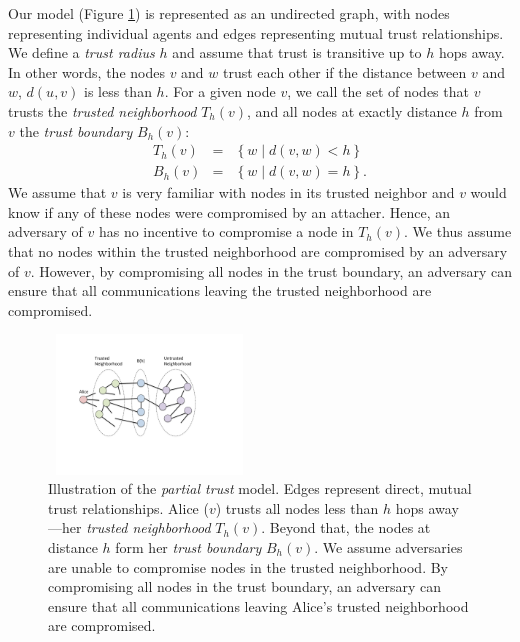\documentclass{sig-alternate-05-2015}
\newcommand{\beq}{\begin{eqnarray}}
\newcommand{\eeq}{\end{eqnarray}}
\begin{document}
Our model (Figure \ref{fig:trust-source})
is represented as an undirected graph,
with nodes representing individual
agents and edges representing mutual trust relationships.
We define a {\em trust radius} $h$ and assume that trust is transitive
up to $h$ hops away.
In other words, the nodes $v$ and $w$ trust each other if the distance between $v$ and $w$, $d(u,v)$ is less than $h$.
For a given node $v$, we call the set of nodes that $v$ trusts the {\em trusted neighborhood} $T_h(v)$,
and all nodes at exactly distance $h$ from $v$ the {\em trust boundary} $B_h(v)$:
\beq
T_h(v) &=& \left\{ w \mid d(v,w) < h \right\} \\
B_h(v) &=& \left\{ w \mid d(v,w) = h \right\}.
\eeq
We assume that $v$ is very familiar with nodes in its trusted neighbor and $v$ would know if any of these nodes were compromised by an attacher. Hence, an adversary of $v$ has no incentive to compromise a node in  $T_h(v)$. We thus assume that no nodes within the trusted neighborhood are compromised
by an adversary of $v$. However, by compromising all nodes in the trust boundary, an adversary can
ensure that all communications leaving the trusted neighborhood are compromised. 

\begin{figure}
\centerline{\includegraphics[width=2.12in,height=1.46in]{fig-alice_trusted_neigh2}}
\caption{
Illustration of the {\em partial trust} model.
Edges represent direct, mutual trust relationships.
Alice ($v$) trusts all nodes less than
$h$ hops away---her {\em trusted neighborhood} $T_h(v)$.
Beyond that, the nodes at distance $h$ form her {\em trust boundary} $B_h(v)$.
We assume adversaries are unable to compromise nodes in the trusted neighborhood.
By compromising all nodes in the trust boundary, an adversary can ensure that
all communications leaving Alice's trusted neighborhood are compromised.
}
\label{fig:trust-source}
\end{figure}
\end{document}
